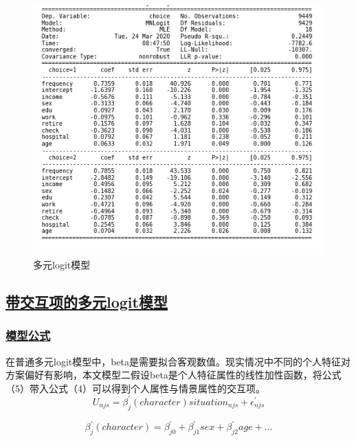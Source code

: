 \documentclass[10pt, conference, compsocconf]{IEEEtran}
\begin{document}
\begin{CJK}{UTF8}{gbsn}
\begin{figure}[ht]
\centering
\includegraphics[scale=0.5]{res1_10.png}
\caption{多元logit模型}
\end{figure}


\subsection{\underline{带交互项的多元logit模型}}
\subsubsection{\underline{模型公式}}
在普通多元logit模型中，beta是需要拟合客观数值。现实情况中不同的个人特征对方案偏好有影响，本文模型二假设beta是个人特征属性的线性加性函数，将公式（5）带入公式（4）可以得到个人属性与情景属性的交互项。
\begin{equation}
U_{njs} = \beta^{'}_{j}(character) situation_{njs} + \epsilon_{njs}^{'}
\end{equation}

\begin{equation}
\beta_{j}^{'}(character) = \beta_{j0}^{'} + \beta_{j1}^{'}sex + \beta_{j2}^{'}age + ...
\end{equation}


\end{CJK}
\end{document}

